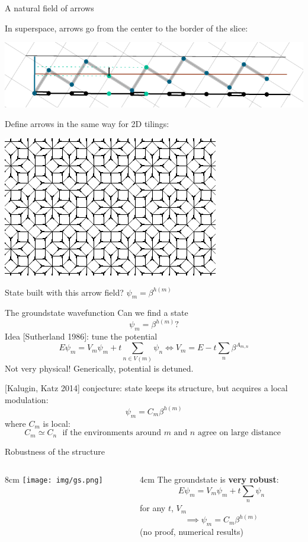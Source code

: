 \documentclass[xcolor=x11names,compress,professionalfonts, aspectratio=169]{beamer}
\renewcommand{\(}{\begin{columns}}
\renewcommand{\)}{\end{columns}}
\newcommand{\<}[1]{\begin{column}{#1}}
\renewcommand{\>}{\end{column}}
\begin{document}
\begin{frame}{A natural field of arrows}

In superspace, arrows go from the center to the border of the slice:

{\centering
\includegraphics[scale=.8]{img/cut_and_project_arrows.pdf}

}

Define arrows in the same way for 2D tilings:

{\centering
\includegraphics[scale=.9]{img/arrowed_tiling_excerpt.pdf}

}

State built with this arrow field? $\psi_m = \beta^{h(m)}$
\end{frame}

\begin{frame}{The groundstate wavefunction}
Can we find a state
\[
\psi_m = \beta^{h(m)} ?
\]
Idea [Sutherland 1986]: tune the potential
\[
	E \psi_m = V_m \psi_m + t \sum_{n \in V(m)} \psi_n \Longleftrightarrow V_m = E - t\sum_n \beta^{A_{m,n}}
\]
Not very physical! Generically, potential is detuned.

[Kalugin, Katz 2014] conjecture: state keeps its structure, but acquires a local modulation:
\[
	\psi_m = C_{m} \beta^{h(m)}
\]
where $C_m$ is local:
\[
	C_m \simeq C_n \text{~ if the environments around $m$ and $n$ agree on large distance }
\]
\end{frame}

\begin{frame}{Robustness of the structure}

\begin{columns}
\<{8cm}
\texttt{[image: img/gs.png]}
\>
\<{4cm}
The groundstate is \textbf{very robust}: 
\[
	E \psi_m = V_m \psi_m + t\sum_{n} \psi_n
\]
for any $t$, $V_m$
\[
	\implies \psi_m = C_m \beta^{h(m)}
\]
(no proof, numerical results)
\>
\end{columns}
\end{frame}
\end{document}
